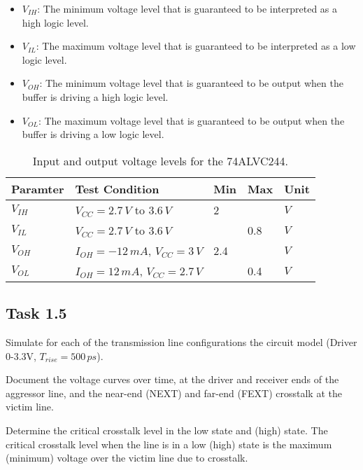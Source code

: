 \documentclass[../main.tex]{subfiles}
\begin{document}
\begin{itemize}
    \item $V_{IH}$: The minimum voltage level that is guaranteed to be interpreted as a high logic level.
    \item $V_{IL}$: The maximum voltage level that is guaranteed to be interpreted as a low logic level.
    \item $V_{OH}$: The minimum voltage level that is guaranteed to be output when the buffer is driving a high logic level.
    \item $V_{OL}$: The maximum voltage level that is guaranteed to be output when the buffer is driving a low logic level.
\end{itemize}

\begin{table}[h]
    \centering
    \begin{tabular}{l|l|lll}
        \toprule[1pt]
        \textbf{Paramter} & \textbf{Test Condition} & \textbf{Min} & \textbf{Max} & \textbf{Unit} \\
        \midrule
        $V_{IH}$ & $V_{CC} = 2.7\,\si{V}$ to $3.6\,\si{V}$ & 2 &     & $\si{V}$ \\
        $V_{IL}$ & $V_{CC} = 2.7\,\si{V}$ to $3.6\,\si{V}$ &   & 0.8 & $\si{V}$ \\
        $V_{OH}$ & $I_{OH} = -12\,\si{mA}$, $V_{CC} = 3\,\si{V}$& 2.4&&$\si{V}$ \\
        $V_{OL}$ & $I_{OH} = 12\,\si{mA}$, $V_{CC} = 2.7\,\si{V}$&&0.4&$\si{V}$ \\
        \bottomrule[1pt]
    \end{tabular}
    \caption{Input and output voltage levels for the 74ALVC244.}
    \label{tab:io-levels}
\end{table}

\newpage

\subsection{Task 1.5}

Simulate for each of the transmission line configurations the circuit model (Driver 0-3.3V, $T_{rise} = 500\,\si{ps}$).

\vspace{10pt}
Document the voltage curves over time, at the driver and receiver ends of the aggressor line, and the near-end (NEXT) and far-end (FEXT) crosstalk at the victim line.

\vspace{10pt}
Determine the critical crosstalk level in the low state and (high) state. The critical crosstalk level when the line is in a low (high) state is the maximum (minimum) voltage over the victim line due to crosstalk.
\end{document}

